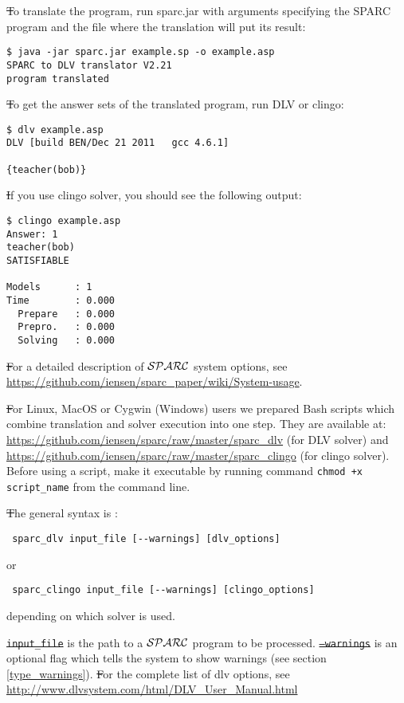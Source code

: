 \documentclass[12pt, letterpaper]{article}
\begin{document}
\st To translate the program, run sparc.jar with arguments specifying the SPARC program and the file where the translation will put its result:
\begin{verbatim}
$ java -jar sparc.jar example.sp -o example.asp
SPARC to DLV translator V2.21
program translated
\end{verbatim}

\st To get the answer sets of the translated program, run DLV or clingo:

\begin{verbatim}
$ dlv example.asp
DLV [build BEN/Dec 21 2011   gcc 4.6.1]

{teacher(bob)}
\end{verbatim}

\st If you use clingo solver, you should  see the following output:

\begin{verbatim}
$ clingo example.asp
Answer: 1
teacher(bob) 
SATISFIABLE

Models      : 1     
Time        : 0.000
  Prepare   : 0.000
  Prepro.   : 0.000
  Solving   : 0.000
\end{verbatim}


\st  For a detailed description of ${\cal SPARC}$ system options, see 
\url{https://github.com/iensen/sparc_paper/wiki/System-usage}.

\st For Linux, MacOS or Cygwin (Windows) users we prepared Bash scripts which combine translation and solver execution into one step.
They are available at: \url{https://github.com/iensen/sparc/raw/master/sparc_dlv} (for DLV solver) and \url{https://github.com/iensen/sparc/raw/master/sparc_clingo} (for clingo solver).
Before using a script, make it executable by running command
\texttt{chmod +x script\_name} from the command line.

\st The general syntax is :
\begin{verbatim}
 sparc_dlv input_file [--warnings] [dlv_options]
\end{verbatim}
or 
\begin{verbatim}
 sparc_clingo input_file [--warnings] [clingo_options]
\end{verbatim}
depending on which solver is used.


\st
\texttt{input\_file} is the path to a ${\cal SPARC}$ program to be processed. 
\st
\texttt{--warnings} is an optional flag which tells the system to show warnings 
(see section \ref{type_warnings}).
\st
For the complete list of dlv options, see 
\url{http://www.dlvsystem.com/html/DLV_User_Manual.html }
\end{document}
